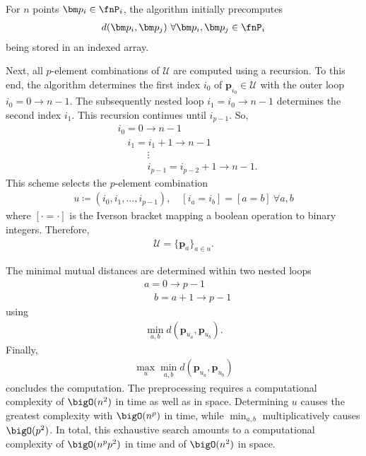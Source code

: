 %
For $n$ points $\bm p_i \in \fnP_i$, the algorithm initially precomputes
\begin{align*}
  d(\bm p_i, \bm p_j)\ \forall \bm p_i, \bm p_j \in \fnP_i
\end{align*}
being stored in an indexed array.

Next, all $p$-element combinations of $\mathcal U$ are computed using a recursion. To this end, the algorithm determines the first index $i_0$ of $\bm p_{i_0} \in \mathcal U$ with the outer loop $i_0 = 0 \rightarrow n-1$. The subsequently nested loop $i_1 = i_0 \rightarrow n-1$ determines the second index $i_1$. This recursion continues until $i_{p-1}$. So,
\begin{align*}
  &i_0 = 0 \rightarrow n-1 \\
  &\quad i_1 = i_1+1 \rightarrow n-1 \\
  &\qquad\quad \vdots \\
  &\qquad\quad i_{p-1} = i_{p-2}+1 \rightarrow n-1.
\end{align*}
This scheme selects the $p$-element combination
\begin{align*}
  u \coloneqq (i_0, i_1, ..., i_{p-1}),\quad [i_a = i_b] = [a = b]\ \forall a,b
\end{align*}
where $[\cdot = \cdot]$ is the Iverson bracket mapping a boolean operation to binary integers. Therefore,
\begin{align*}
  \mathcal U = \{\bm p_a \}_{a \in u}.
\end{align*}

The minimal mutual distances are determined within two nested loops
\begin{align*}
  &a = 0 \rightarrow p-1 \\
  &\quad b = a+1 \rightarrow p-1 
\end{align*}
using
\begin{align*}
  \min_{a,b} d(\bm p_{u_a}, \bm p_{u_b}).
\end{align*}
Finally,
\begin{align*}
  \max_{u} \min_{a,b} d(\bm p_{u_a}, \bm p_{u_b})
\end{align*}
concludes the computation. The preprocessing requires a computational complexity of $\bigO(n^2)$ in time as well as in space. Determining $u$ causes the greatest complexity with $\bigO(n^p)$ in time, while $\min_{a,b}$ multiplicatively causes $\bigO(p^2)$. In total, this exhaustive search amounts to a computational complexity of $\bigO(n^p p^2)$ in time and of $\bigO(n^2)$ in space.

